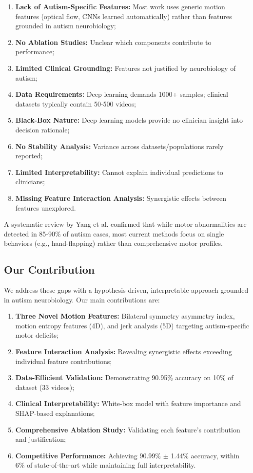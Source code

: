 \documentclass[conference]{IEEEtran}
\begin{document}
\begin{enumerate}
\item \textbf{Lack of Autism-Specific Features:} Most work uses generic motion features (optical flow, CNNs learned automatically) rather than features grounded in autism neurobiology;
\item \textbf{No Ablation Studies:} Unclear which components contribute to performance;
\item \textbf{Limited Clinical Grounding:} Features not justified by neurobiology of autism;
\item \textbf{Data Requirements:} Deep learning demands 1000+ samples; clinical datasets typically contain 50-500 videos;
\item \textbf{Black-Box Nature:} Deep learning models provide no clinician insight into decision rationale;
\item \textbf{No Stability Analysis:} Variance across datasets/populations rarely reported;
\item \textbf{Limited Interpretability:} Cannot explain individual predictions to clinicians;
\item \textbf{Missing Feature Interaction Analysis:} Synergistic effects between features unexplored.
\end{enumerate}

A systematic review by Yang et al. \cite{early_diagnosis2025} confirmed that while motor abnormalities are detected in 85-90\% of autism cases, most current methods focus on single behaviors (e.g., hand-flapping) rather than comprehensive motor profiles.

\subsection{Our Contribution}

We address these gaps with a hypothesis-driven, interpretable approach grounded in autism neurobiology. Our main contributions are:

\begin{enumerate}
\item \textbf{Three Novel Motion Features:} Bilateral symmetry asymmetry index, motion entropy features (4D), and jerk analysis (5D) targeting autism-specific motor deficits;
\item \textbf{Feature Interaction Analysis:} Revealing synergistic effects exceeding individual feature contributions;
\item \textbf{Data-Efficient Validation:} Demonstrating 90.95\% accuracy on 10\% of dataset (33 videos);
\item \textbf{Clinical Interpretability:} White-box model with feature importance and SHAP-based explanations;
\item \textbf{Comprehensive Ablation Study:} Validating each feature's contribution and justification;
\item \textbf{Competitive Performance:} Achieving 90.99\% $\pm$ 1.44\% accuracy, within 6\% of state-of-the-art while maintaining full interpretability.
\end{enumerate}
\end{document}

